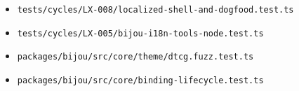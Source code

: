 \begin{itemize}
\tightlist
\item
  \texttt{t\allowbreak{}e\allowbreak{}s\allowbreak{}t\allowbreak{}s\allowbreak{}/\allowbreak{}c\allowbreak{}y\allowbreak{}c\allowbreak{}l\allowbreak{}e\allowbreak{}s\allowbreak{}/\allowbreak{}L\allowbreak{}X\allowbreak{}-\allowbreak{}0\allowbreak{}0\allowbreak{}8\allowbreak{}/\allowbreak{}l\allowbreak{}o\allowbreak{}c\allowbreak{}a\allowbreak{}l\allowbreak{}i\allowbreak{}z\allowbreak{}e\allowbreak{}d\allowbreak{}-\allowbreak{}s\allowbreak{}h\allowbreak{}e\allowbreak{}l\allowbreak{}l\allowbreak{}-\allowbreak{}a\allowbreak{}n\allowbreak{}d\allowbreak{}-\allowbreak{}d\allowbreak{}o\allowbreak{}g\allowbreak{}f\allowbreak{}o\allowbreak{}o\allowbreak{}d\allowbreak{}.\allowbreak{}t\allowbreak{}e\allowbreak{}s\allowbreak{}t\allowbreak{}.\allowbreak{}t\allowbreak{}s}
\item
  \texttt{t\allowbreak{}e\allowbreak{}s\allowbreak{}t\allowbreak{}s\allowbreak{}/\allowbreak{}c\allowbreak{}y\allowbreak{}c\allowbreak{}l\allowbreak{}e\allowbreak{}s\allowbreak{}/\allowbreak{}L\allowbreak{}X\allowbreak{}-\allowbreak{}0\allowbreak{}0\allowbreak{}5\allowbreak{}/\allowbreak{}b\allowbreak{}i\allowbreak{}j\allowbreak{}o\allowbreak{}u\allowbreak{}-\allowbreak{}i\allowbreak{}1\allowbreak{}8\allowbreak{}n\allowbreak{}-\allowbreak{}t\allowbreak{}o\allowbreak{}o\allowbreak{}l\allowbreak{}s\allowbreak{}-\allowbreak{}n\allowbreak{}o\allowbreak{}d\allowbreak{}e\allowbreak{}.\allowbreak{}t\allowbreak{}e\allowbreak{}s\allowbreak{}t\allowbreak{}.\allowbreak{}t\allowbreak{}s}
\item
  \texttt{p\allowbreak{}a\allowbreak{}c\allowbreak{}k\allowbreak{}a\allowbreak{}g\allowbreak{}e\allowbreak{}s\allowbreak{}/\allowbreak{}b\allowbreak{}i\allowbreak{}j\allowbreak{}o\allowbreak{}u\allowbreak{}/\allowbreak{}s\allowbreak{}r\allowbreak{}c\allowbreak{}/\allowbreak{}c\allowbreak{}o\allowbreak{}r\allowbreak{}e\allowbreak{}/\allowbreak{}t\allowbreak{}h\allowbreak{}e\allowbreak{}m\allowbreak{}e\allowbreak{}/\allowbreak{}d\allowbreak{}t\allowbreak{}c\allowbreak{}g\allowbreak{}.\allowbreak{}f\allowbreak{}u\allowbreak{}z\allowbreak{}z\allowbreak{}.\allowbreak{}t\allowbreak{}e\allowbreak{}s\allowbreak{}t\allowbreak{}.\allowbreak{}t\allowbreak{}s}
\item
  \texttt{p\allowbreak{}a\allowbreak{}c\allowbreak{}k\allowbreak{}a\allowbreak{}g\allowbreak{}e\allowbreak{}s\allowbreak{}/\allowbreak{}b\allowbreak{}i\allowbreak{}j\allowbreak{}o\allowbreak{}u\allowbreak{}/\allowbreak{}s\allowbreak{}r\allowbreak{}c\allowbreak{}/\allowbreak{}c\allowbreak{}o\allowbreak{}r\allowbreak{}e\allowbreak{}/\allowbreak{}b\allowbreak{}i\allowbreak{}n\allowbreak{}d\allowbreak{}i\allowbreak{}n\allowbreak{}g\allowbreak{}-\allowbreak{}l\allowbreak{}i\allowbreak{}f\allowbreak{}e\allowbreak{}c\allowbreak{}y\allowbreak{}c\allowbreak{}l\allowbreak{}e\allowbreak{}.\allowbreak{}t\allowbreak{}e\allowbreak{}s\allowbreak{}t\allowbreak{}.\allowbreak{}t\allowbreak{}s}
\end{itemize}

